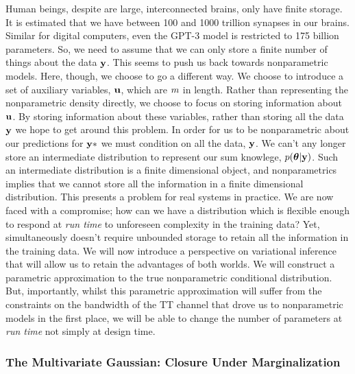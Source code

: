 \documentclass[a4paperpaper,]{article}
\begin{document}
Human beings, despite are large, interconnected brains, only have finite
storage. It is estimated that we have between 100 and 1000 trillion
synapses in our brains. Similar for digital computers, even the GPT-3
model is restricted to 175 billion parameters. So, we need to assume
that we can only store a finite number of things about the data
\(\mathbf{ y}\). This seems to push us back towards nonparametric
models. Here, though, we choose to go a different way. We choose to
introduce a set of auxiliary variables, \(\mathbf{ u}\), which are
\(m\) in length. Rather than representing the nonparametric
density directly, we choose to focus on storing information about
\(\mathbf{ u}\). By storing information about these variables,
rather than storing all the data \(\mathbf{ y}\) we hope to get around
this problem. In order for us to be nonparametric about our predictions
for \(\mathbf{ y}*\) we must condition on all the data, \(\mathbf{ y}\).
We can't any longer store an intermediate distribution to represent our
sum knowlege, \(p(\boldsymbol{ \theta}|\mathbf{ y})\). Such an intermediate
distribution is a finite dimensional object, and nonparametrics implies
that we cannot store all the information in a finite dimensional
distribution. This presents a problem for real systems in practice. We
are now faced with a compromise; how can we have a distribution which is
flexible enough to respond at \emph{run time} to unforeseen complexity
in the training data? Yet, simultaneously doesn't require unbounded
storage to retain all the information in the training data. We will now
introduce a perspective on variational inference that will allow us to
retain the advantages of both worlds. We will construct a parametric
approximation to the true nonparametric conditional distribution. But,
importantly, whilst this parametric approximation will suffer from the
constraints on the bandwidth of the TT channel that drove us to
nonparametric models in the first place, we will be able to change the
number of parameters at \emph{run time} not simply at design time.

\hypertarget{the-multivariate-gaussian-closure-under-marginalization}{%
\subsubsection{The Multivariate Gaussian: Closure Under
Marginalization}\label{the-multivariate-gaussian-closure-under-marginalization}}
\end{document}
